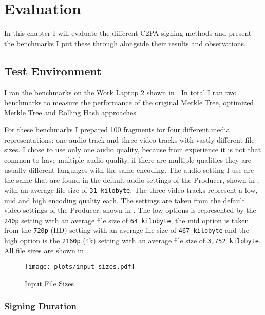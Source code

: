 \chapter{Evaluation\label{cha:chapter6}}

In this chapter I will evaluate the different C2PA signing methods and present the benchmarks I put these through alongside their results and observations.

\section{Test Environment\label{sec:testenvir}}

I ran the benchmarks on the Work Laptop 2 shown in . In total I ran two benchmarks to measure the performance of the original Merkle Tree, optimized Merkle Tree and Rolling Hash approaches.

For these benchmarks I prepared 100 fragments for four different media representations: one audio track and three video tracks with vastly different file sizes. I chose to use only one audio quality, because from experience it is not that common to have multiple audio quality, if there are multiple qualities they are usually different languages with the same encoding. The audio setting I use are the same that are found in the default audio settings of the Producer, shown in , with an average file size of \texttt{31 kilobyte}. The three video tracks represent a low, mid and high encoding quality each. The settings are taken from the default video settings of the Producer, shown in . The low options is represented by the \texttt{240p} setting with an average file size of \texttt{64 kilobyte}, the mid option is taken from the \texttt{720p} (HD) setting with an average file size of \texttt{467 kilobyte} and the high option is the \texttt{2160p} (4k) setting with an average file size of \texttt{3,752 kilobyte}. All file sizes are shown in .

\begin{figure}[t]
    \centering
    \texttt{[image: plots/input-sizes.pdf]}
    \caption{Input File Sizes}
    \label{fig:file-size}
\end{figure}

\subsection{Signing Duration}

